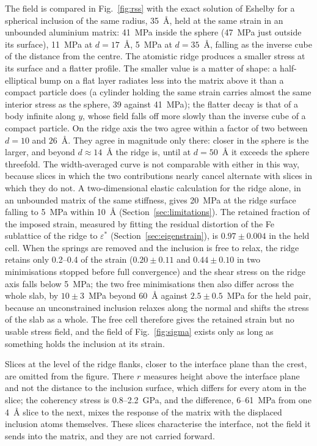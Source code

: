 The field is compared in Fig.~\ref{fig:rss} with the exact solution of
Eshelby \cite{Eshelby1957} for a spherical inclusion of the same radius,
35~\AA{}, held at the same strain in an unbounded aluminium matrix: 41~MPa
inside the sphere (47~MPa just outside its surface), 11~MPa at $d=17$~\AA{}, 5~MPa at
$d=35$~\AA{}, falling as the inverse cube of the distance from the centre.
The atomistic ridge produces a smaller stress at its surface and a flatter
profile. The smaller value is a matter of shape: a half-elliptical bump on a
flat layer radiates less into the matrix above it than a compact particle
does (a cylinder holding the same strain carries almost the same interior
stress as the sphere, 39 against 41~MPa); the flatter decay is that of a body
infinite along $y$, whose field falls off more slowly than the inverse cube
of a compact particle. On the ridge axis the two agree within a factor of two between $d=10$ and
$26$~\AA{}. They agree in magnitude only there: closer in the sphere is the
larger, and beyond $d\approx14$~\AA{} the ridge is, until at $d=50$~\AA{} it
exceeds the sphere threefold. The width-averaged curve is not comparable with
either in this way, because slices in which the two contributions nearly
cancel alternate with slices in which they do not. A two-dimensional elastic calculation for the ridge
alone, in an unbounded matrix of the same stiffness, gives 20~MPa at the
ridge surface falling to 5~MPa within 10~\AA{}
(Section~\ref{sec:limitations}). The retained fraction of the imposed
strain, measured by fitting the residual distortion of the Fe sublattice of
the ridge to $\varepsilon^{*}$ (Section~\ref{sec:eigenstrain}), is
$0.97\pm0.004$ in the held cell. When the springs are removed and the inclusion is free to relax, the ridge
retains only 0.2--0.4 of the strain ($0.20\pm0.11$ and $0.44\pm0.10$ in two
minimisations stopped before full convergence) and the shear stress on the
ridge axis falls below 5~MPa; the two free minimisations then also differ across the
whole slab, by $10\pm3$~MPa beyond 60~\AA{} against $2.5\pm0.5$~MPa for the
held pair, because an unconstrained inclusion relaxes along the normal and
shifts the stress of the slab as a whole. The free cell therefore gives the
retained strain but no usable stress field, and the field of
Fig.~\ref{fig:sigma} exists only as long as something holds the inclusion at
its strain.

Slices at the level of the ridge flanks, closer to the interface plane than
the crest, are omitted from the figure. There $r$ measures height above the
interface plane and not the distance to the inclusion surface, which differs
for every atom in the slice; the coherency stress is 0.8--2.2~GPa, and the
difference, 6--61~MPa from one 4~\AA{} slice to the next, mixes the response
of the matrix with the displaced inclusion atoms themselves. These slices
characterise the interface, not the field it sends into the matrix, and they
are not carried forward.

